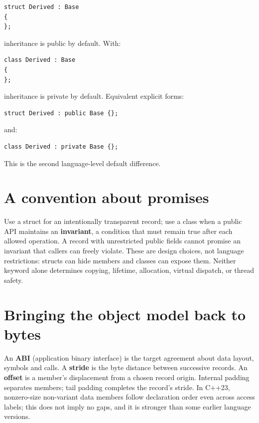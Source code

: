 \begin{verbatim}
struct Derived : Base
{
};
\end{verbatim}

inheritance is public by default. With:

\begin{verbatim}
class Derived : Base
{
};
\end{verbatim}

inheritance is private by default. Equivalent explicit forms:

\begin{verbatim}
struct Derived : public Base {};
\end{verbatim}

and:

\begin{verbatim}
class Derived : private Base {};
\end{verbatim}

This is the second language-level default difference.

\section{A convention about promises}\label{01-foundations-i-ch003-a-convention-about-promises}

\hypertarget{01-foundations-i-ch003-a-convention-about-promises}{}

Use a struct for an intentionally transparent record; use a class when a public API maintains an \textbf{invariant}, a condition that must remain true after each allowed operation. A record with unrestricted public fields cannot promise an invariant that callers can freely violate. These are design choices, not language restrictions: structs can hide members and classes can expose them. Neither keyword alone determines copying, lifetime, allocation, virtual dispatch, or thread safety.

\section{Bringing the object model back to bytes}\label{01-foundations-i-ch003-bringing-the-object-model-back-to-bytes}

\hypertarget{01-foundations-i-ch003-bringing-the-object-model-back-to-bytes}{}

An \textbf{ABI} (application binary interface) is the target agreement about data layout, symbols and calls. A \textbf{stride} is the byte distance between successive records. An \textbf{offset} is a member's displacement from a chosen record origin. Internal padding separates members; tail padding completes the record's stride. In C++23, nonzero-size non-variant data members follow declaration order even across access labels; this does not imply no gaps, and it is stronger than some earlier language versions.

